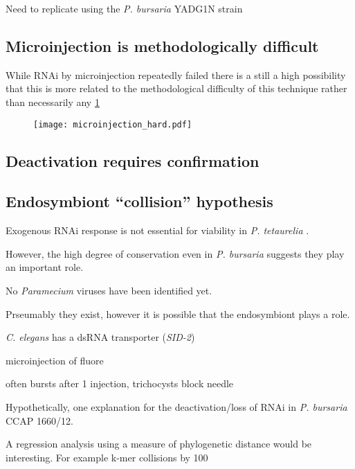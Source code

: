 Need to replicate using the \textit{P. bursaria} YADG1N strain

\subsection{Microinjection is methodologically difficult}

While RNAi by microinjection repeatedly failed there is a still a high possibility
that this is more related to the methodological difficulty of this technique rather than
necessarily any 
\cref{fig:microinjection_nucleus}

\begin{figure}
    \texttt{[image: microinjection\_hard.pdf]}
    \caption{}
    \label{fig:microinjection_nucleus}
\end{figure}


\subsection{Deactivation requires confirmation}





\subsection{Endosymbiont ``collision'' hypothesis}

Exogenous RNAi response is not essential for viability in \textit{P. tetaurelia}
\citep{Marker2014}.

However, the high degree of conservation even in \textit{P. bursaria}
suggests they play an important role. 

No \textit{Paramecium} viruses have been identified yet. 

Prseumably they exist, however it is possible that the endosymbiont plays a role.


\textit{C. elegans} has a dsRNA transporter (\textit{SID-2}) \citep{Nuez2012}


microinjection of fluore

often bursts after 1 injection, trichocysts block needle







Hypothetically, one explanation for the deactivation/loss
of RNAi in \textit{P. bursaria} CCAP 1660/12.




A regression analysis using a measure of phylogenetic distance would be interesting.
For example k-mer collisions by 100


